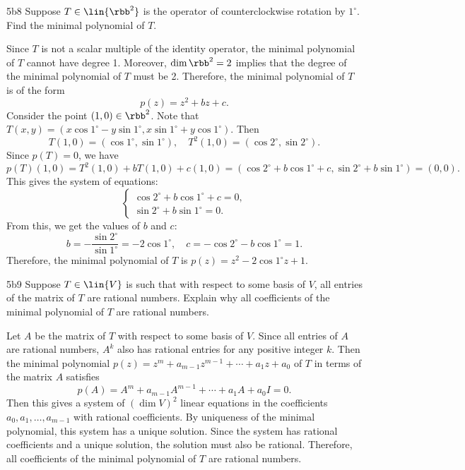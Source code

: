 \begin{exercise}{5b8}
    Suppose $T \in \lin{\rbb^2}$ is the operator of counterclockwise rotation by $1^\circ$.
	Find the minimal polynomial of $T$.

\end{exercise}

\begin{sol}
    Since $T$ is not a scalar multiple of the identity operator, the minimal polynomial of $T$ cannot have degree 1.
	Moreover, $\dim \rbb^2 = 2$ implies that the degree of the minimal polynomial of $T$ must be 2.
	Therefore, the minimal polynomial of $T$ is of the form
    \[
    	p(z) = z^2 + bz + c.
    \]
    Consider the point $(1, 0) \in \rbb^2$.
	Note that $T(x, y) = (x \cos 1^\circ - y \sin 1^\circ, x \sin 1^\circ + y \cos 1^\circ)$.
	Then
    \[
    	T(1, 0) = (\cos 1^\circ, \sin 1^\circ), \quad T^2(1, 0) = (\cos 2^\circ, \sin 2^\circ).
    \]
    Since $p(T) = 0$, we have
    \[
    	p(T)(1, 0) = T^2(1, 0) + bT(1, 0) + c(1, 0) = (\cos 2^\circ + b \cos 1^\circ + c, \sin 2^\circ + b \sin 1^\circ) = (0, 0).
    \]
    This gives the system of equations:
    \[
        \begin{cases}
            \cos 2^\circ + b \cos 1^\circ + c = 0, \\
            \sin 2^\circ + b \sin 1^\circ = 0.
        \end{cases}
    \]
    From this, we get the values of $b$ and $c$:
    \[
    	b = -\frac{\sin 2^\circ}{\sin 1^\circ} = -2 \cos 1^\circ, \quad c = -\cos 2^\circ - b \cos 1^\circ = 1.
    \]
    Therefore, the minimal polynomial of $T$ is $p(z) = z^2 - 2 \cos 1^\circ z + 1$.
\end{sol}

\begin{exercise}{5b9}
    Suppose $T \in \lin{V}$ is such that with respect to some basis of $V$, all entries of the matrix of $T$ are rational numbers.
	Explain why all coefficients of the minimal polynomial of $T$ are rational numbers.
\end{exercise}

\begin{sol}
    Let $A$ be the matrix of $T$ with respect to some basis of $V$.
	Since all entries of $A$ are rational numbers, $A^k$ also has rational entries for any positive integer $k$.
	Then the minimal polynomial $p(z) = z^m + a_{m-1} z^{m-1} + \cdots + a_1 z + a_0$ of $T$ in terms of the matrix $A$ satisfies
    \[
    	p(A) = A^m + a_{m-1} A^{m-1} + \cdots + a_1 A + a_0 I = 0.
    \]
    Then this gives a system of $(\dim V)^2$ linear equations in the coefficients $a_0, a_1, \ldots, a_{m-1}$ with rational coefficients.
	By uniqueness of the minimal polynomial, this system has a unique solution.
	Since the system has rational coefficients and a unique solution, the solution must also be rational.
	Therefore, all coefficients of the minimal polynomial of $T$ are rational numbers.
\end{sol}

